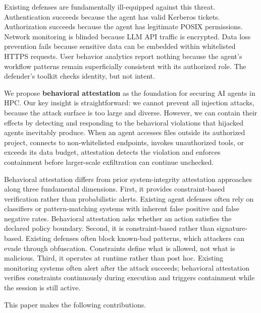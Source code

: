 Existing defenses are fundamentally ill-equipped against this threat. Authentication succeeds because the agent has valid Kerberos tickets. Authorization succeeds because the agent has legitimate POSIX permissions. Network monitoring is blinded because LLM API traffic is encrypted. Data loss prevention fails because sensitive data can be embedded within whitelisted HTTPS requests. User behavior analytics report nothing because the agent's workflow patterns remain superficially consistent with its authorized role. The defender's toolkit checks identity, but not intent.

We propose \textbf{behavioral attestation} as the foundation for securing AI agents in HPC. Our key insight is straightforward: we cannot prevent all injection attacks, because the attack surface is too large and diverse. However, we can contain their effects by detecting and responding to the behavioral violations that hijacked agents inevitably produce. When an agent accesses files outside its authorized project, connects to non-whitelisted endpoints, invokes unauthorized tools, or exceeds its data budget, attestation detects the violation and enforces containment before larger-scale exfiltration can continue unchecked.

Behavioral attestation differs from prior system-integrity attestation approaches along three fundamental dimensions. First, it provides constraint-based verification rather than probabilistic alerts. Existing agent defenses often rely on classifiers or pattern-matching systems with inherent false positive and false negative rates. Behavioral attestation asks whether an action satisfies the declared policy boundary. Second, it is constraint-based rather than signature-based. Existing defenses often block known-bad patterns, which attackers can evade through obfuscation. Constraints define what is allowed, not what is malicious. Third, it operates at runtime rather than post hoc. Existing monitoring systems often alert after the attack succeeds; behavioral attestation verifies constraints continuously during execution and triggers containment while the session is still active.

This paper makes the following contributions.

